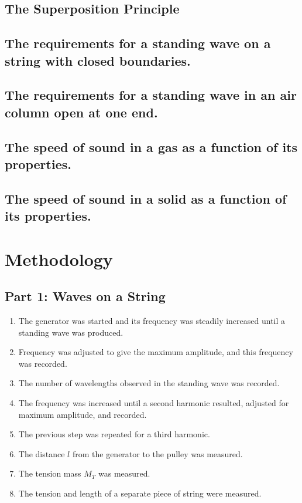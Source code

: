 \documentclass[twocolumn,english]{IEEEtran}
\theoremstyle{plain}
\theoremstyle{plain}
\begin{document}
\subsection*{The Superposition Principle}

\subsection*{The requirements for a standing wave on a string with closed boundaries.}

\subsection*{The requirements for a standing wave in an air column open at one end.}

\subsection*{The speed of sound in a gas as a function of its properties.}

\subsection*{The speed of sound in a solid as a function of its properties.}

\section{Methodology}
\subsection*{Part 1: Waves on a String}
\begin{enumerate}
 \item The generator was started and its frequency was steadily increased until a standing wave was produced.
 \item Frequency was adjusted to give the maximum amplitude, and this frequency was recorded.
 \item The number of wavelengths observed in the standing wave was recorded.
 \item The frequency was increased until a second harmonic resulted, adjusted for maximum amplitude, and recorded.
 \item The previous step was repeated for a third harmonic.
 \item The distance $l$ from the generator to the pulley was measured.
 \item The tension mass $M_T$ was measured.
 \item The tension and length of a separate piece of string were measured.
\end{enumerate}
\end{document}

